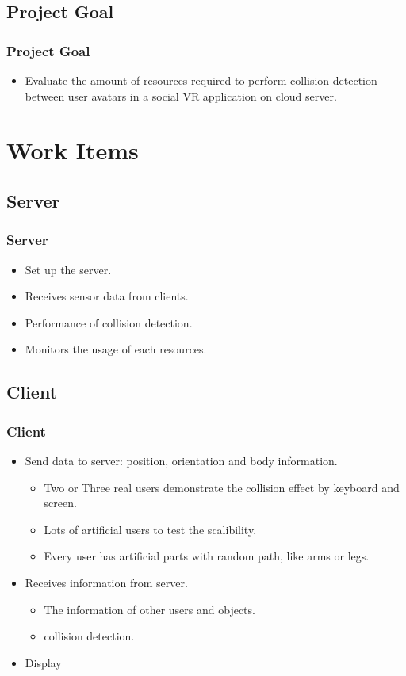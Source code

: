 \documentclass{beamer}
\begin{document}
\subsection{Project Goal}
	\begin{frame}
	\frametitle{Project Goal}
	\begin{itemize}
		\item Evaluate the amount of resources required to perform collision detection between user avatars in a social VR application on cloud server.
	\end{itemize}
	\end{frame}

\section{Work Items}

\subsection{Server}
	\begin{frame}
	\frametitle{Server}
	\begin{itemize}
		\item Set up the server.
		\item Receives sensor data from clients.
		\item Performance of collision detection.
		\item Monitors the usage of each resources.
	\end{itemize}
	\end{frame}

\subsection{Client}
	\begin{frame}
	\frametitle{Client}
	\begin{itemize}
		\item Send data to server: position, orientation and body information.
			\begin{itemize}
				\item Two or Three real users demonstrate the collision effect by keyboard and screen.
				\item Lots of artificial users to test the scalibility.
				\item Every user has artificial parts with random path, like arms or legs.
			\end{itemize}
		\item Receives information from server.
			\begin{itemize}
				\item The information of other users and objects.
				\item collision detection.
			\end{itemize}
		\item Display
	\end{itemize}
	\end{frame}
\end{document}
